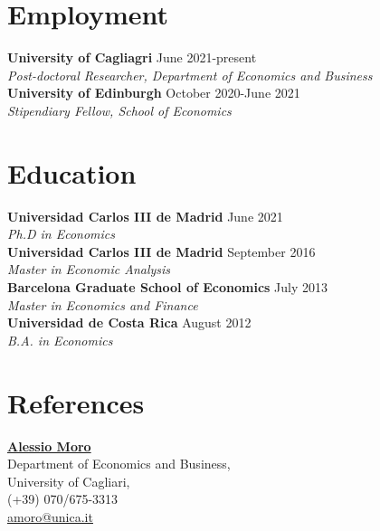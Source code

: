\documentclass[margin]{res} %
\begin{document}
\begin{resume}

 
\section{Employment}
{\bf University of Cagliagri} \hfill June 2021-present  \\
{\sl Post-doctoral Researcher, Department of Economics and Business} \\
{\bf University of Edinburgh} \hfill October 2020-June 2021  \\
{\sl Stipendiary Fellow, School of Economics} 


\section{Education}
{\bf Universidad Carlos III de Madrid} \hfill June 2021  \\
{\sl Ph.D in Economics} \\
{\bf Universidad Carlos III de Madrid} \hfill September 2016 \\
{\sl Master in Economic Analysis} \\
{\bf Barcelona Graduate School of Economics} \hfill July 2013 \\
{\sl Master in Economics and Finance}  \\
{\bf Universidad de Costa Rica} \hfill August 2012 \\
{\sl B.A. in Economics}

\section{References}
\begin{multicols}{2}
	
	\href{http://http://www.alessiomoro.it/}{\bf{Alessio Moro}} \\
	Department of Economics and Business, \\
	University of Cagliari, \\
	(+39) 070/675-3313 \\
	\href{mailto:amoro@unica.it}{amoro@unica.it}
	

\end{multicols}
\end{resume}
\end{document}
